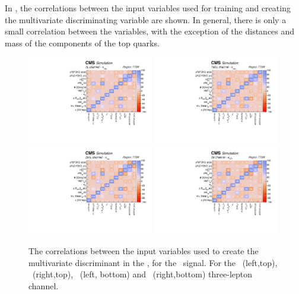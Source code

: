 \newpage
In , the correlations between the input variables used for training and creating the multivariate discriminating variable are shown. In general, there is only a small correlation between the variables, with the exception of the distances and mass of the components of the top quarks. 
\begin{figure}[htbp]
	\centering
	\includegraphics[width=0.49\textwidth]{6_Search/Figures/PlotsTechnics/correlationsigZuttoppairuuu}
	\includegraphics[width=0.49\textwidth]{6_Search/Figures/PlotsTechnics/correlationsigZuttoppairuue}
	\includegraphics[width=0.49\textwidth]{6_Search/Figures/PlotsTechnics/correlationsigZuttoppaireeu}
	\includegraphics[width=0.49\textwidth]{6_Search/Figures/PlotsTechnics/correlationsigZuttoppaireee}
	\caption{The correlations between the input variables used to create the multivariate discriminant in the \TTSR, for the \Zut\ signal. For the \mumumu\ (left,top), \emumu\ (right,top), \eemu\ (left, bottom) and \eee\ (right,bottom) three-lepton channel.}
	\label{fig:correlationsigzuttoppair}
\end{figure}

